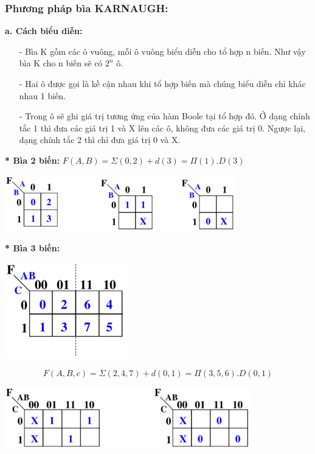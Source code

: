 \subsubsection{Phương pháp bìa KARNAUGH:}
\textbf{a. Cách biểu diễn:} 
\begin{itemize}
    \item[-] Bìa K gồm các ô vuông, mỗi ô vuông biểu diễn cho tổ hợp n biến. Như vậy bìa K cho n biến sẽ có $2^n$ ô.
    \item[-] Hai ô được gọi là kề cận nhau khi tổ hợp biến mà chúng biểu diễn chỉ khác nhau 1 biến.
    \item[-] Trong ô sẽ ghi giá trị tương ứng của hàm Boole tại tổ hợp đó. Ở dạng chính tắc 1 thì đưa các giá trị 1 và X lên các ô, không đưa các giá trị 0. Ngược lại, dạng chính tắc 2 thì chỉ đưa giá trị 0 và X.
\end{itemize}
\textbf{* Bìa 2 biến:} $F(A,B) = \varSigma(0,2) + d(3) = \varPi(1).D(3)$
\begin{center}
    \includegraphics[width = 0.75\textwidth]{./local/image/27.png}
\end{center}
\textbf{* Bìa 3 biến:}
\begin{center}
    \includegraphics[width = 0.4\textwidth]{./local/image/28.png}
\end{center}
\[
    F(A,B,c) = \varSigma(2,4,7) + d(0,1) = \varPi(3,5,6).D(0,1)
\]
\begin{center}
    \includegraphics[width = 0.8\textwidth]{./local/image/29.png}
\end{center}
